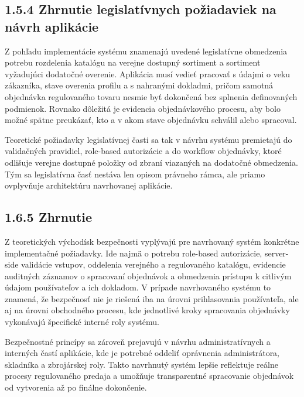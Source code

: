 \subsection*{1.5.4 Zhrnutie legislatívnych požiadaviek na návrh aplikácie}
Z pohľadu implementácie systému znamenajú uvedené legislatívne obmedzenia potrebu rozdelenia katalógu na verejne dostupný sortiment a sortiment vyžadujúci dodatočné overenie. Aplikácia musí vedieť pracovať s údajmi o veku zákazníka, stave overenia profilu a s nahranými dokladmi, pričom samotná objednávka regulovaného tovaru nesmie byť dokončená bez splnenia definovaných podmienok. Rovnako dôležitá je evidencia objednávkového procesu, aby bolo možné spätne preukázať, kto a v akom stave objednávku schválil alebo spracoval.

Teoretické požiadavky legislatívnej časti sa tak v návrhu systému premietajú do validačných pravidiel, role-based autorizácie a do workflow objednávky, ktoré odlišuje verejne dostupné položky od zbraní viazaných na dodatočné obmedzenia. Tým sa legislatívna časť nestáva len opisom právneho rámca, ale priamo ovplyvňuje architektúru navrhovanej aplikácie.

\subsection*{1.6.5 Zhrnutie}
Z teoretických východísk bezpečnosti vyplývajú pre navrhovaný systém konkrétne implementačné požiadavky. Ide najmä o potrebu role-based autorizácie, server-side validácie vstupov, oddelenia verejného a regulovaného katalógu, evidencie auditných záznamov o spracovaní objednávok a obmedzenia prístupu k citlivým údajom používateľov a ich dokladom. V prípade navrhovaného systému to znamená, že bezpečnosť nie je riešená iba na úrovni prihlasovania používateľa, ale aj na úrovni obchodného procesu, kde jednotlivé kroky spracovania objednávky vykonávajú špecifické interné roly systému.

Bezpečnostné princípy sa zároveň prejavujú v návrhu administratívnych a interných častí aplikácie, kde je potrebné oddeliť oprávnenia administrátora, skladníka a zbrojárskej roly. Takto navrhnutý systém lepšie reflektuje reálne procesy regulovaného predaja a umožňuje transparentné spracovanie objednávok od vytvorenia až po finálne dokončenie.

